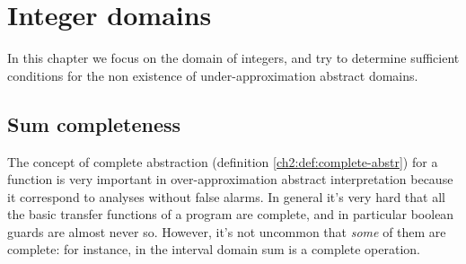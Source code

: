 \chapter{Integer domains}
In this chapter we focus on the domain of integers, and try to determine sufficient conditions for the non existence of under-approximation abstract domains.

\section{Sum completeness}
The concept of complete abstraction (definition \ref{ch2:def:complete-abstr}) for a function is very important in over-approximation abstract interpretation because it correspond to analyses without false alarms. In general it's very hard that all the basic transfer functions of a program are complete, and in particular boolean guards are almost never so. However, it's not uncommon that \textit{some} of them are complete: for instance, in the interval domain sum is a complete operation.

